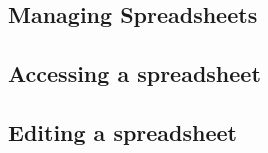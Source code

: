 \subsection{Managing Spreadsheets}


\subsection{Accessing a spreadsheet}


\subsection{Editing a spreadsheet}

